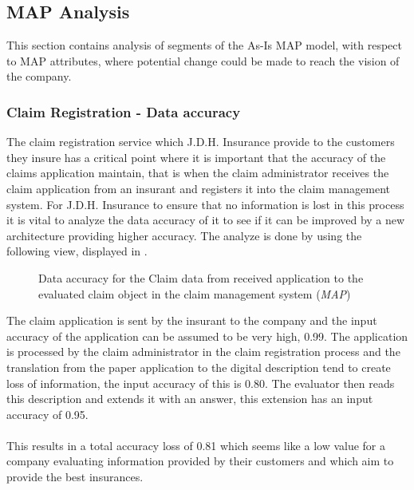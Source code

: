 \subsection{MAP Analysis}
\label{sec:map_analysis}
This section contains analysis of segments of the As-Is MAP model, with respect to MAP attributes, where potential change could be made to reach the vision of the company.
\subsubsection{Claim Registration - Data accuracy}
\label{sec:claim_analysis}
The claim registration service which J.D.H. Insurance provide to the customers they insure has a critical point where it is important that the accuracy of the claims application maintain, that is when the claim administrator receives the claim application from an insurant and registers it into the claim management system. For J.D.H. Insurance to ensure that no information is lost in this process it is vital to analyze the data accuracy of it to see if it can be improved by a new architecture providing higher accuracy. The analyze is done by using the following view, displayed in .
\begin{center}
	\begin{figure}[H]
		\centering
		\setlength\fboxsep{7pt}
		\setlength\fboxrule{0.5pt}
		\caption{Data accuracy for the Claim data from received application to the evaluated claim object in the claim management system (\emph{MAP})}
		\label{fig:map_claim_data}
	\end{figure}
\end{center}
The claim application is sent by the insurant to the company and the input accuracy of the application can be assumed to be very high, 0.99. The application is processed by the claim administrator in the claim registration process and the translation from the paper application to the digital description tend to create loss of information, the input accuracy of this is 0.80. The evaluator then reads this description and extends it with an answer, this extension has an input accuracy of 0.95.\\\\
%
This results in a total accuracy loss of 0.81 which seems like a low value for a company evaluating information provided by their customers and which aim to provide the best insurances.

%
